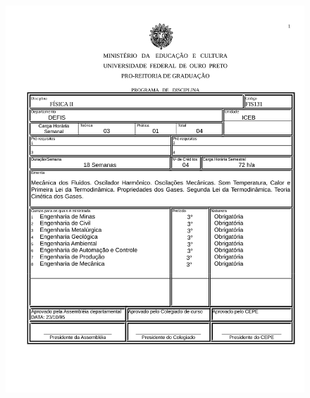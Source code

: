 \begin{figure}[p]
	\centering 
	\includegraphics[scale=0.7]{capitulos/anexo1-programas-disciplina/p32.pdf}
\end{figure}

